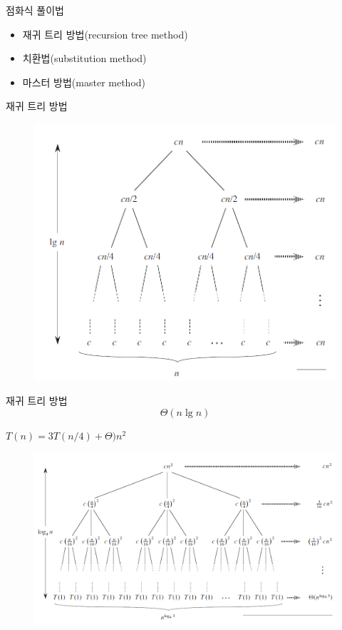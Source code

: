 \documentclass[10pt]{beamer}
\begin{document}
\begin{frame}{점화식 풀이법}
    \begin{itemize}
        \item 재귀 트리 방법(recursion tree method)
        \item 치환법(substitution method)
        \item 마스터 방법(master method)
    \end{itemize}
\end{frame}



\begin{frame}{재귀 트리 방법}
    \begin{figure}[h!]
        \includegraphics[scale=0.4]{mergetree.png}
    \end{figure}
\end{frame}    




\begin{frame}{재귀 트리 방법}
    $$\Theta(n \lg n)$$
\end{frame}


\begin{frame}{ex}
    $T(n) = 3T(n/4) + \Theta)n^2$
    
    \begin{figure}[h!]
        \includegraphics[scale=0.3]{tree.png}
    \end{figure}
\end{frame}
\end{document}
